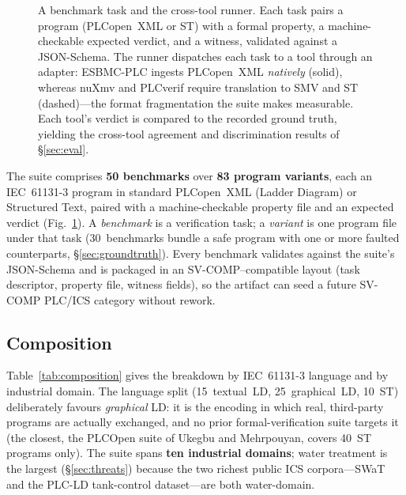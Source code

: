 \begin{figure}[t]
\caption{A benchmark task and the cross-tool runner. Each task pairs a program
(PLCopen~XML or ST) with a formal property, a machine-checkable expected verdict, and a
witness, validated against a JSON-Schema. The runner dispatches each task to a tool through
an adapter: ESBMC-PLC ingests PLCopen~XML \emph{natively} (solid), whereas nuXmv and PLCverif
require translation to SMV and ST (dashed)---the format fragmentation the suite makes
measurable. Each tool's verdict is compared to the recorded ground truth, yielding the
cross-tool agreement and discrimination results of \S\ref{sec:eval}.}
\label{fig:pipeline}
\end{figure}

The suite comprises \textbf{50 benchmarks} over \textbf{83 program variants},
each an IEC~61131-3 program in standard PLCopen~XML (Ladder Diagram) or Structured
Text, paired with a machine-checkable property file and an expected verdict
(Fig.~\ref{fig:pipeline}). A
\emph{benchmark} is a verification task; a \emph{variant} is one program file under
that task (30~benchmarks bundle a safe program with one or more faulted counterparts,
\S\ref{sec:groundtruth}). Every benchmark validates against the suite's JSON-Schema
and is packaged in an SV-COMP--compatible layout (task descriptor, property file,
witness fields), so the artifact can seed a future SV-COMP PLC/ICS category without
rework.

\subsection{Composition}
Table~\ref{tab:composition} gives the breakdown by IEC~61131-3 language and by
industrial domain. The language split (15~textual~LD, 25~graphical~LD, 10~ST)
deliberately favours \emph{graphical} LD: it is the encoding in which real,
third-party programs are actually exchanged, and no prior formal-verification suite
targets it (the closest, the PLCOpen suite of Ukegbu and Mehrpouyan, covers 40~ST
programs only). The suite spans \textbf{ten industrial domains}; water treatment is
the largest (\S\ref{sec:threats}) because the two richest public ICS corpora---SWaT
and the PLC-LD tank-control dataset---are both water-domain.

